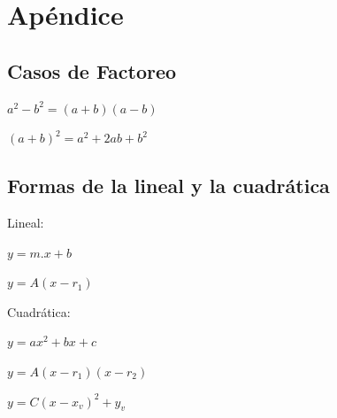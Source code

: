 \documentclass[a4paper,11pt,spanish,sans]{exam}
\begin{document}
%
%



\section*{Apéndice}
\subsection*{Casos de Factoreo}

$a^2-b^2=(a+b)(a-b)$

$(a+b)^2=a^2+2ab+b^2$

\subsection*{Formas de la lineal y la cuadrática}
\begin{multicols}{2}
Lineal:

$y=m.x+b$

$y=A(x-r_1)$

\columnbreak 

Cuadrática:

$y=ax^2+bx+c$

$y=A(x-r_1)(x-r_2)$

$y=C(x-x_v)^2+y_v$
\end{multicols}
\end{document}
